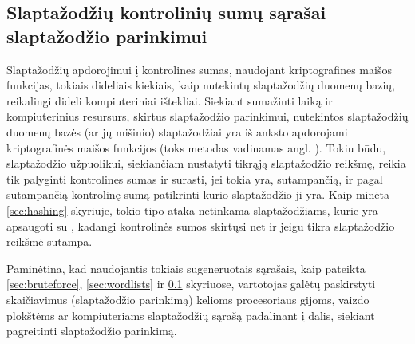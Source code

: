 \documentclass{VUMIFInfBakalaurinis}
\begin{document}
\subsection{Slaptažodžių kontrolinių sumų sąrašai slaptažodžio parinkimui} 
\label{sec:rainbowtables}
Slaptažodžių apdorojimui į kontrolines sumas, naudojant kriptografines maišos 
funkcijas, tokiais dideliais kiekiais, kaip nutekintų slaptažodžių duomenų 
bazių, reikalingi dideli kompiuteriniai ištekliai. Siekiant sumažinti laiką ir 
kompiuterinius resursurs, skirtus slaptažodžio parinkimui, nutekintos 
slaptažodžių duomenų bazės (ar jų mišinio) slaptažodžiai yra iš anksto 
apdorojami kriptografinės maišos funkcijos (toks metodas vadinamas angl. 
). Tokiu būdu, slaptažodžio užpuolikui, siekiančiam 
nustatyti tikrąją slaptažodžio reikšmę, reikia tik palyginti kontrolines sumas 
ir surasti, jei tokia yra, sutampančią, ir pagal sutampančią kontrolinę sumą 
patikrinti kurio slaptažodžio ji yra. Kaip minėta \ref{sec:hashing} skyriuje, 
tokio tipo ataka netinkama slaptažodžiams, kurie yra apsaugoti su 
, kadangi kontrolinės sumos skirtųsi net ir jeigu tikra 
slaptažodžio reikšmė sutampa.

Paminėtina, kad naudojantis tokiais sugeneruotais sąrašais, kaip pateikta 
\ref{sec:bruteforce}, \ref{sec:wordlists} ir \ref{sec:rainbowtables} skyriuose, 
vartotojas galėtų paskirstyti skaičiavimus (slaptažodžio parinkimą) kelioms 
procesoriaus gijoms, vaizdo plokštėms ar kompiuteriams slaptažodžių sąrašą 
padalinant į dalis, siekiant pagreitinti slaptažodžio parinkimą.

% 
\end{document}
